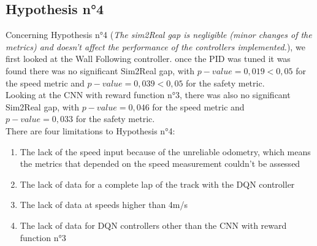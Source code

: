 \subsection{Hypothesis n°4}
Concerning Hypothesis n°4 (\textit{The sim2Real gap is negligible (minor changes of the metrics) and doesn't affect the performance of the controllers implemented.}), we first looked at the Wall Following controller. once the PID was tuned it was found there was no significant Sim2Real gap, with $p-value=0,019<0,05$ for the speed metric and $p-value=0,039<0,05$ for the safety metric. \\
Looking at the CNN with reward function n°3, there was also no significant Sim2Real gap, with $p-value=0,046$ for the speed metric and $p-value=0,033$ for the safety metric. \\ 
There are four limitations to Hypothesis n°4:
\begin{enumerate}
	\item The lack of the speed input because of the unreliable odometry, which means the metrics that depended on the speed measurement couldn't be assessed
	\item The lack of data for a complete lap of the track with the DQN controller
	\item The lack of data at speeds higher than 4m/s
	\item The lack of data for DQN controllers other than the CNN with reward function n°3
\end{enumerate}

